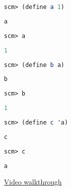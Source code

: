 \begin{lstlisting}[language=Scheme]
scm> (define a 1)
\end{lstlisting}
\begin{solution}[0.3in]
\begin{lstlisting}[language=Scheme]
a
\end{lstlisting}
\end{solution}

\begin{lstlisting}[language=Scheme]
scm> a
\end{lstlisting}
\begin{solution}[0.3in]
\begin{lstlisting}[language=Scheme]
1
\end{lstlisting}
\end{solution}

\begin{lstlisting}[language=Scheme]
scm> (define b a)
\end{lstlisting}
\begin{solution}[0.3in]
\begin{lstlisting}[language=Scheme]
b
\end{lstlisting}
\end{solution}

\begin{lstlisting}[language=Scheme]
scm> b
\end{lstlisting}
\begin{solution}[0.3in]
\begin{lstlisting}[language=Scheme]
1
\end{lstlisting}
\end{solution}

\begin{lstlisting}[language=Scheme]
scm> (define c 'a)
\end{lstlisting}
\begin{solution}[0.3in]
\begin{lstlisting}[language=Scheme]
c
\end{lstlisting}
\end{solution}

\begin{lstlisting}[language=Scheme]
scm> c
\end{lstlisting}
\begin{solution}[0.3in]
\begin{lstlisting}[language=Scheme]
a
\end{lstlisting}
\href{https://youtu.be/J0wAfcoBoR4?t=10m46s}{Video walkthrough}
\end{solution}
